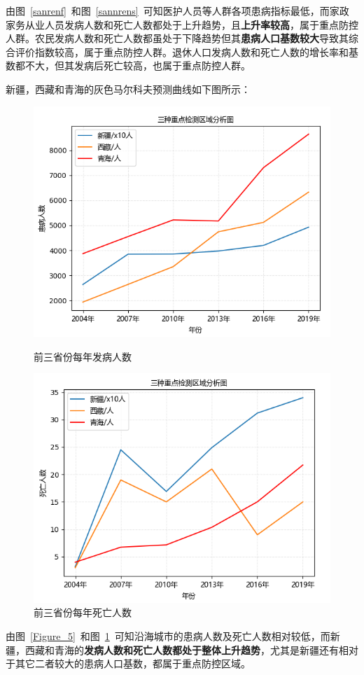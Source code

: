 \documentclass{whutmod}
\begin{document}
由图~\ref{sanrenf}~和图~\ref{sannrens}~可知医护人员等人群各项患病指标最低，而家政家务从业人员发病人数和死亡人数都处于上升趋势，且\textbf{上升率较高}，属于重点防控人群。农民发病人数和死亡人数都虽处于下降趋势但其\textbf{患病人口基数较大}导致其综合评价指数较高，属于重点防控人群。退休人口发病人数和死亡人数的增长率和基数都不大，但其发病后死亡较高，也属于重点防控人群。

新疆，西藏和青海的灰色马尔科夫预测曲线如下图所示：
	\begin{figure}[H]
	\begin{minipage}[t]{0.5\linewidth}
		\centering
		\includegraphics[width=\textwidth]{figures/Figure_5.png}
		\caption{前三省份每年发病人数}\label{Figure_5}
	\end{minipage}
	\hfill%
	\begin{minipage}[t]{0.5\linewidth}
		\centering
		\includegraphics[width=\textwidth]{figures/Figure_1.png}
		\caption{前三省份每年死亡人数}\label{Figure_6}
	\end{minipage}
\end{figure}
由图~\ref{Figure_5}~和图~\ref{Figure_6}~可知沿海城市的患病人数及死亡人数相对较低，而新疆，西藏和青海的\textbf{发病人数和死亡人数都处于整体上升趋势}，尤其是新疆还有相对于其它二者较大的患病人口基数，都属于重点防控区域。
\end{document}
